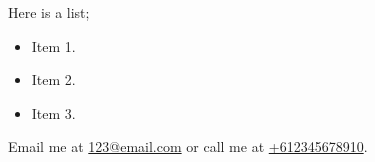 \documentclass[12pt,busletter,addrfromright,orderfromdateto]{newlfm}
\begin{document}
\begin{newlfm}
	
	
	\lipsum[1]
	
	\lipsum[2]
	
	Here is a list;
	\begin{itemize}
		\item Item 1.
		\item Item 2.
		\item Item 3.
	\end{itemize}
	
	\lipsum[3]
	
	Email me at \href{mailto:123@email.com}{123@email.com} or call me at \href{tel:+612345678910}{+612345678910}.
	
	
	
\end{newlfm}
\end{document}
